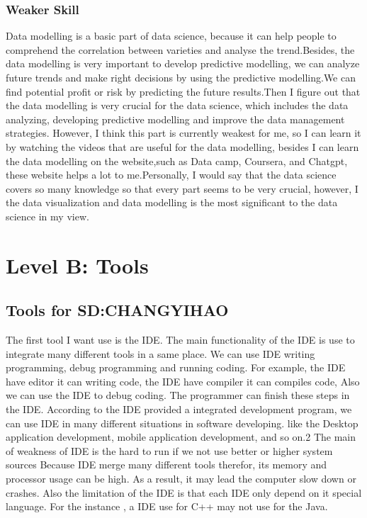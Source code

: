 \documentclass[a4paper, 11pt]{report}
\begin{document}
\subsubsection{Weaker Skill}
	Data modelling is a basic part of data science, because it can help people to comprehend the correlation between varieties and analyse the trend.Besides, the data modelling is very important to develop predictive modelling, we can analyze future trends and make right decisions by using the predictive modelling.We can find potential profit or risk by predicting the future results.Then I figure out that the data modelling is very crucial for the data science, which includes the data analyzing, developing predictive modelling and improve the data management strategies. However, I think this part is currently weakest for me, so I can learn it by watching the videos that are useful for the data modelling, besides I can learn the data modelling on the website,such as Data camp, Coursera, and Chatgpt, these website helps a lot to me.Personally, I would say that the data science covers so many knowledge so that every part seems to be very crucial, however, I the data visualization and data modelling is the most significant to the data science in my view.

\newpage
\section{Level B: Tools}
\subsection{Tools for SD:CHANGYIHAO}
The first tool I want use is the IDE. The main functionality of the IDE is use to integrate many different tools in a same place. We can use IDE writing programming, debug programming and running coding. For example, the IDE have editor it can writing code, the IDE have compiler it can compiles code, Also we can use the IDE to debug coding. The programmer can finish these steps in the IDE. 
According to the IDE provided a integrated development program, we can use IDE in many different situations in software developing. like the Desktop application development, mobile application development, and so on.2
The main of weakness of IDE is the hard to run if we not use better or higher system sources \cite{IDE1}
Because IDE merge many different tools therefor, its memory and processor usage can be high. As a result, it may lead the computer slow down or crashes. Also the limitation of the IDE is that each IDE only depend on it special language. For the instance , a IDE use for C++  may not use for the Java. \cite{IDE2}
\end{document}
